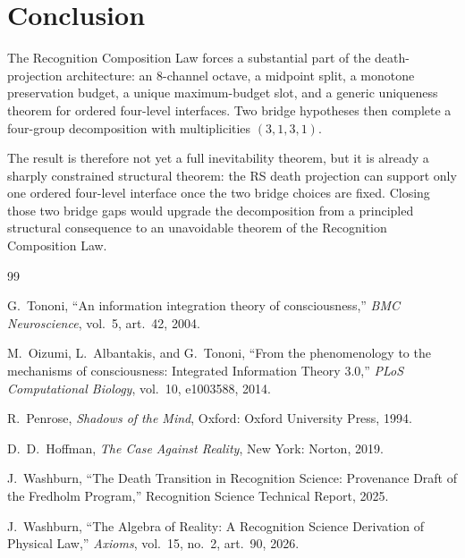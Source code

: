 \documentclass[11pt,a4paper]{article}
\theoremstyle{definition}
\begin{document}
\section{Conclusion}
\label{sec:conclusion}

The Recognition Composition Law forces a substantial part of the
death-projection architecture: an 8-channel octave, a midpoint split,
a monotone preservation budget, a unique maximum-budget slot, and a
generic uniqueness theorem for ordered four-level interfaces.
Two bridge hypotheses then complete a four-group decomposition with
multiplicities $(3,1,3,1)$.

The result is therefore not yet a full inevitability theorem, but it is
already a sharply constrained structural theorem: the RS death
projection can support only one ordered four-level interface once the
two bridge choices are fixed. Closing those two bridge gaps would
upgrade the decomposition from a principled structural consequence to an
unavoidable theorem of the Recognition Composition Law.

\begin{thebibliography}{99}

G.~Tononi,
``An information integration theory of consciousness,''
\textit{BMC Neuroscience}, vol.~5, art.~42, 2004.

M.~Oizumi, L.~Albantakis, and G.~Tononi,
``From the phenomenology to the mechanisms of consciousness:
Integrated Information Theory 3.0,''
\textit{PLoS Computational Biology}, vol.~10, e1003588, 2014.

R.~Penrose,
\textit{Shadows of the Mind},
Oxford: Oxford University Press, 1994.

D.~D.~Hoffman,
\textit{The Case Against Reality},
New York: Norton, 2019.

J.~Washburn,
``The Death Transition in Recognition Science: Provenance Draft of the
Fredholm Program,''
Recognition Science Technical Report, 2025.

J.~Washburn,
``The Algebra of Reality: A Recognition Science Derivation of Physical Law,''
\textit{Axioms}, vol.~15, no.~2, art.~90, 2026.

\end{thebibliography}

\appendix
\end{document}
